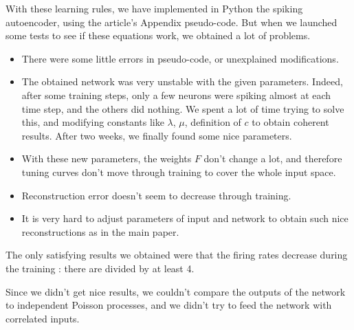 \documentclass[a4paper,10pt, english]{article}
\begin{document}
With these learning rules, we have implemented in Python the spiking autoencoder, using the article's Appendix pseudo-code.
But when we launched some tests to see if these equations work, we obtained a lot of problems.
\begin{itemize}
 \item There were some little errors in pseudo-code, or unexplained modifications.
 \item The obtained network was very unstable with the given parameters. Indeed, after some training steps,
 only a few neurons were spiking almost at each time step, and the others did nothing. We spent a lot of 
 time trying to solve this, and modifying constants like $\lambda$, $\mu$, definition of $c$ to obtain coherent 
 results. After two weeks, we finally found some nice parameters.
 \item With these new parameters, the weights $F$ don't change a lot, and therefore tuning curves don't move through
 training to cover the whole input space.
 \item Reconstruction error doesn't seem to decrease through training.
 \item It is very hard to adjust parameters of input and network to obtain such nice reconstructions as in 
 the main paper.
 
\end{itemize}


The only satisfying results we obtained were that the firing rates decrease during the training : there are divided
by at least 4.

Since we didn't get nice results, we couldn't compare the outputs of the network to independent Poisson processes, and we didn't
try to feed the network with correlated inputs.
\end{document}
